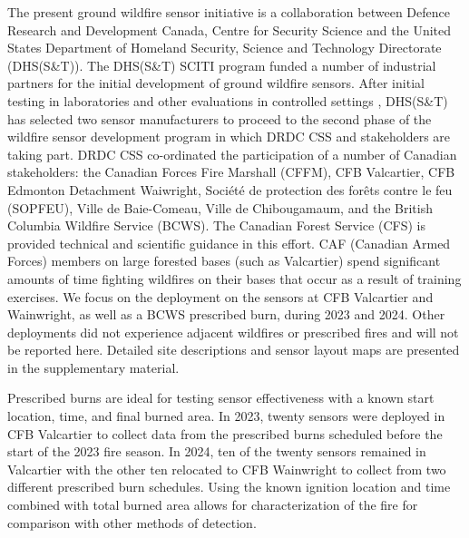 \documentclass[fire,article,submit,moreauthors]{mdpi}
\begin{document}
The present ground wildfire sensor initiative is a collaboration between
Defence Research and Development Canada, Centre for Security Science and
the United States Department of Homeland Security, Science and
Technology Directorate (DHS(S\&T)). The DHS(S\&T) SCITI program funded a
number of industrial partners for the initial development of ground
wildfire sensors. After initial testing in laboratories and other
evaluations in controlled settings \citep{usdhsSTWildfireSensor2021},
DHS(S\&T) has selected two sensor manufacturers to proceed to the second
phase of the wildfire sensor development program in which DRDC CSS and
stakeholders are taking part. DRDC CSS co-ordinated the participation of
a number of Canadian stakeholders: the Canadian Forces Fire Marshall
(CFFM), CFB Valcartier, CFB Edmonton Detachment Waiwright, Société de
protection des forêts contre le feu (SOPFEU), Ville de Baie-Comeau,
Ville de Chibougamaum, and the British Columbia Wildfire Service (BCWS).
The Canadian Forest Service (CFS) is provided technical and scientific
guidance in this effort. CAF (Canadian Armed Forces) members on large
forested bases (such as Valcartier) spend significant amounts of time
fighting wildfires on their bases that occur as a result of training
exercises. We focus on the deployment on the sensors at CFB Valcartier
and Wainwright, as well as a BCWS prescribed burn, during 2023 and 2024.
Other deployments did not experience adjacent wildfires or prescribed
fires and will not be reported here. Detailed site descriptions and
sensor layout maps are presented in the supplementary material.

Prescribed burns are ideal for testing sensor effectiveness with a known
start location, time, and final burned area. In 2023, twenty sensors
were deployed in CFB Valcartier to collect data from the prescribed
burns scheduled before the start of the 2023 fire season. In 2024, ten
of the twenty sensors remained in Valcartier with the other ten
relocated to CFB Wainwright to collect from two different prescribed
burn schedules. Using the known ignition location and time combined with
total burned area allows for characterization of the fire for comparison
with other methods of detection.
\end{document}
